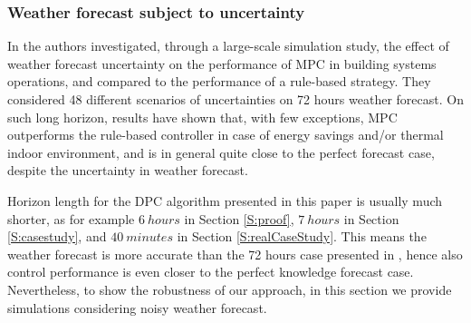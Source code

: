 \textcolor[rgb]{0,0,1}{
\subsubsection{Weather forecast subject to uncertainty}\label{SSS:DisturbanceUncertain}
In \cite{Petersen2014AE} the authors investigated, through a large-scale simulation study, the effect of weather forecast uncertainty on the performance of MPC in building systems operations, and compared to the performance of a rule-based strategy.
They considered 48 different scenarios of uncertainties on 72 hours weather forecast.
On such long horizon, results have shown that, with few exceptions, MPC outperforms the rule-based controller in case of energy savings and/or thermal indoor environment, and is in general quite close to the perfect forecast case, despite the uncertainty in weather forecast.}

\textcolor[rgb]{0,0,1}{Horizon length for the DPC algorithm presented in this paper is usually much shorter, as for example $6\ hours$ in Section \ref{S:proof}, $7\ hours$ in Section \ref{S:casestudy}, and $40\ minutes$ in Section \ref{S:realCaseStudy}. This means the weather forecast is more accurate than the 72 hours case presented in \cite{Petersen2014AE}, hence also control performance is even closer to the perfect knowledge forecast case.
Nevertheless, to show the robustness of our approach, in this section we provide simulations considering noisy weather forecast.}


